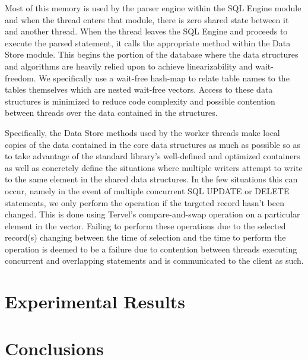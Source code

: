 \documentclass[letter,11pt]{article}
\begin{document}
Most of this memory is used by the parser engine within the SQL Engine module and when the 
thread enters that module, there is zero shared state between it and another thread. When the thread
leaves the SQL Engine and proceeds to execute the parsed statement, it calls the appropriate
method within the Data Store module. This begins the portion of the database where the data 
structures and algorithms are heavily relied upon to achieve linearizability and wait-freedom.
We specifically use a wait-free hash-map to relate table names to the tables themselves which are nested
wait-free vectors. Access to these data structures is minimized to reduce code complexity and 
possible contention between threads over the data contained in the structures.
\par\vspace{\baselineskip}
Specifically, the Data Store methods used by the worker threads make local copies of the data contained
in the core data structures as much as possible so as to take advantage of the standard library's
well-defined and optimized containers as well as concretely define the situations where 
multiple writers attempt to write to the same element in the shared data structures. In the few situations
this can occur, namely in the event of multiple concurrent SQL UPDATE or DELETE statements, we only perform
the operation if the targeted record hasn't been changed. This is done using Tervel's compare-and-swap 
operation on a particular element in the vector. Failing to perform these operations due to the 
selected record(s) changing between the time of selection and the time to perform the operation
is deemed to be a failure due to contention between threads executing concurrent and overlapping statements
and is communicated to the client as such.

\section{Experimental Results}

\section{Conclusions}

\newpage


\newpage
\end{document}
